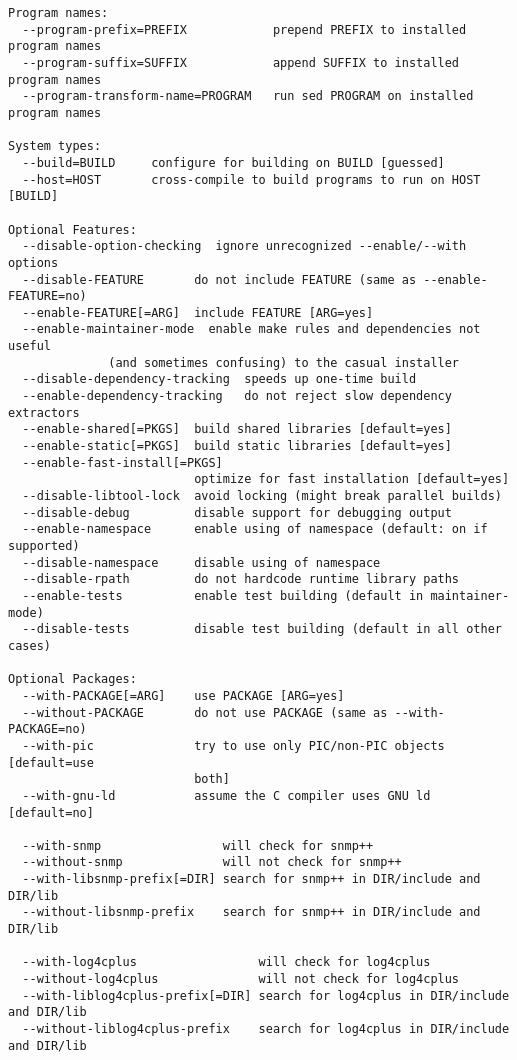 \begin{verbatim}
Program names:
  --program-prefix=PREFIX            prepend PREFIX to installed program names
  --program-suffix=SUFFIX            append SUFFIX to installed program names
  --program-transform-name=PROGRAM   run sed PROGRAM on installed program names

System types:
  --build=BUILD     configure for building on BUILD [guessed]
  --host=HOST       cross-compile to build programs to run on HOST [BUILD]

Optional Features:
  --disable-option-checking  ignore unrecognized --enable/--with options
  --disable-FEATURE       do not include FEATURE (same as --enable-FEATURE=no)
  --enable-FEATURE[=ARG]  include FEATURE [ARG=yes]
  --enable-maintainer-mode  enable make rules and dependencies not useful
			  (and sometimes confusing) to the casual installer
  --disable-dependency-tracking  speeds up one-time build
  --enable-dependency-tracking   do not reject slow dependency extractors
  --enable-shared[=PKGS]  build shared libraries [default=yes]
  --enable-static[=PKGS]  build static libraries [default=yes]
  --enable-fast-install[=PKGS]
                          optimize for fast installation [default=yes]
  --disable-libtool-lock  avoid locking (might break parallel builds)
  --disable-debug         disable support for debugging output
  --enable-namespace      enable using of namespace (default: on if supported)
  --disable-namespace     disable using of namespace
  --disable-rpath         do not hardcode runtime library paths
  --enable-tests          enable test building (default in maintainer-mode)
  --disable-tests         disable test building (default in all other cases)

Optional Packages:
  --with-PACKAGE[=ARG]    use PACKAGE [ARG=yes]
  --without-PACKAGE       do not use PACKAGE (same as --with-PACKAGE=no)
  --with-pic              try to use only PIC/non-PIC objects [default=use
                          both]
  --with-gnu-ld           assume the C compiler uses GNU ld [default=no]

  --with-snmp                 will check for snmp++
  --without-snmp              will not check for snmp++
  --with-libsnmp-prefix[=DIR] search for snmp++ in DIR/include and DIR/lib
  --without-libsnmp-prefix    search for snmp++ in DIR/include and DIR/lib

  --with-log4cplus                 will check for log4cplus
  --without-log4cplus              will not check for log4cplus
  --with-liblog4cplus-prefix[=DIR] search for log4cplus in DIR/include and DIR/lib
  --without-liblog4cplus-prefix    search for log4cplus in DIR/include and DIR/lib


\end{verbatim}
